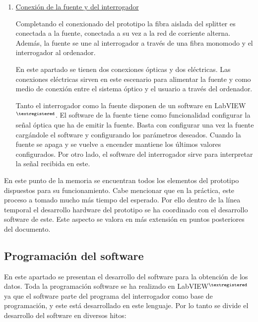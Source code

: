 \begin{itemize}
\begin{enumerate}
	
	\item \underline{Conexión de la fuente y del interrogador}
	
	Completando el conexionado del prototipo la fibra aislada del splitter es conectada a la fuente, conectada a su vez a la red de corriente alterna. Además, la fuente se une al interrogador a través de una fibra monomodo y el interrogador al ordenador. 
	
	En este apartado se tienen dos conexiones ópticas y dos eléctricas. Las conexiones eléctricas sirven en este escenario para alimentar la fuente y como medio de conexión entre el sistema óptico y el usuario a través del ordenador. 
	
	Tanto el interrogador como la fuente disponen de un software en LabVIEW$^{\textregistered}$. El software de la fuente tiene como funcionalidad configurar la señal óptica que ha de emitir la fuente. Basta con configurar una vez la fuente cargándole el software y configurando los parámetros deseados. Cuando la fuente se apaga y se vuelve a encender mantiene los últimos valores configurados. Por otro lado, el software del interrogador sirve para interpretar la señal recibida en este.
	
		
	\end{enumerate}
	 
	
\end{itemize}

En este punto de la memoria se encuentran todos los elementos del prototipo dispuestos para su funcionamiento. Cabe mencionar que en la práctica, este proceso a tomado mucho más tiempo del esperado. Por ello dentro de la línea temporal el desarrollo hardware del prototipo se ha coordinado con el desarrollo software de este. Este aspecto se valora en más extensión en puntos posteriores del documento. 



\subsection{Programación del software}
\label{sec:programacion}

En este apartado se presentan el desarrollo del software para la obtención de los datos. Toda la programación software se ha realizado en LabVIEW$^{\textregistered}$ ya que el software parte del programa del interrogador como base de programación, y este está desarrollado en este lenguaje. Por lo tanto se divide el desarrollo del software en diversos hitos:

